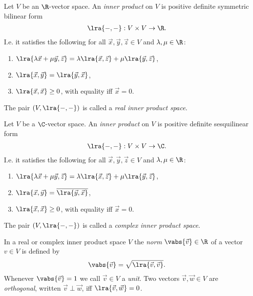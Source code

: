 \documentclass{article}
\begin{document}
\begin{definition}
	Let $V$ be an $\R$-vector space. An \emph{inner product} on $V$ is positive definite symmetric bilinear
	form
	\begin{align*}
		\lra{-,-}:V\times V\to\R.
	\end{align*}
	I.e. it satisfies the following for all $\vec x,\vec y,\vec z\in V$ and $\lambda,\mu\in\R$:
	\begin{enumerate}
		\item $\lra{\lambda\vec x+\mu\vec y,\vec z}=\lambda\lra{\vec x,\vec z}+\mu\lra{\vec y,\vec z}$,
		\item $\lra{\vec x,\vec y}=\lra{\vec y,\vec x}$,
		\item $\lra{\vec x,\vec x}\geq 0$, with equality iff $\vec x =0$.
	\end{enumerate}
	The pair $(V,\lra{-,-})$ is called a \emph{real inner product space}.
\end{definition}

\begin{definition}
	Let $V$ be a $\C$-vector space. An \emph{inner product} on $V$ is positive definite sesquilinear
	form
	\begin{align*}
		\lra{-,-}:V\times V\to\C.
	\end{align*}
	I.e. it satisfies the following for all $\vec x,\vec y,\vec z\in V$ and $\lambda,\mu\in\R$:
	\begin{enumerate}
		\item $\lra{\lambda\vec x+\mu\vec y,\vec z}=\lambda\lra{\vec x,\vec z}+\mu\lra{\vec y,\vec z}$,
		\item $\lra{\vec x,\vec y}=\overline{\lra{\vec y,\vec x}}$,
		\item $\lra{\vec x,\vec x}\geq 0$, with equality iff $\vec x =0$.
	\end{enumerate}
	The pair $(V,\lra{-,-})$ is called a \emph{complex inner product space}.
\end{definition}

\begin{definition}
	In a real or complex inner product space $V$ the \emph{norm} $\vabs{\vec v}\in\R$ of a vector $v\in V$
	is defined by
	\begin{align*}
		\vabs{\vec v}=\sqrt{\lra{\vec v, \vec v}}.
	\end{align*}
	Whenever $\vabs{\vec v}=1$ we call $\vec v\in V$ a \emph{unit}. Two vectors $\vec v,\vec w\in V$
	are \emph{orthogonal}, written $\vec v\perp \vec w$, iff $\lra{\vec v,\vec w}=0$.
\end{definition}
\end{document}

